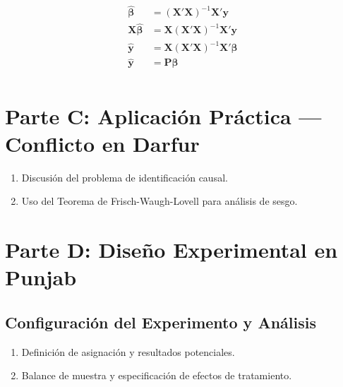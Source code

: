 \documentclass[12pt, letter]{article}
\begin{document}
\begin{align*}
    \boldsymbol{\hat{\beta}} &= (\boldsymbol{X}'\boldsymbol{X})^{-1}\boldsymbol{X}'\boldsymbol{y} \\
    \boldsymbol{X}\boldsymbol{\hat{\beta}} &= \boldsymbol{X}(\boldsymbol{X}'\boldsymbol{X})^{-1}\boldsymbol{X}'\boldsymbol{y} \\
    \boldsymbol{\hat{y}} &= \boldsymbol{X}(\boldsymbol{X}'\boldsymbol{X})^{-1}\boldsymbol{X}'\boldsymbol{\beta} \\
    \boldsymbol{\hat{y}} &= \mathbf{P} \boldsymbol{\beta} \\


\end{align*}


               








                




\section{Parte C: Aplicación Práctica — Conflicto en Darfur}
\begin{enumerate}[label=C.\arabic*]
    \item Discusión del problema de identificación causal.
    \item Uso del Teorema de Frisch-Waugh-Lovell para análisis de sesgo.
\end{enumerate}




\section{Parte D: Diseño Experimental en Punjab}
\subsection{Configuración del Experimento y Análisis}
\begin{enumerate}[label=D.\arabic*]
    \item Definición de asignación y resultados potenciales.
    \item Balance de muestra y especificación de efectos de tratamiento.
\end{enumerate}
\end{document}
